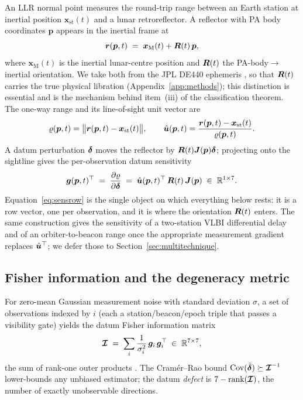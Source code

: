 An LLR normal point measures the round-trip range between an Earth station at
inertial position $\bm{x}_{\mathrm{st}}(t)$ and a lunar retroreflector. A reflector
with PA body coordinates $\bm{p}$ appears in the inertial frame at
\begin{equation}
  \bm{r}(\bm{p},t) \;=\; \bm{x}_{\mathrm{M}}(t) + \bm{R}(t)\,\bm{p},
  \label{eq:beacon}
\end{equation}
where $\bm{x}_{\mathrm{M}}(t)$ is the inertial lunar-centre position and
$\bm{R}(t)$ the PA-body$\rightarrow$inertial orientation. We take both from the
JPL DE440 ephemeris \citep{park2021de440}, so that $\bm{R}(t)$ carries the true
physical libration (Appendix~\ref{app:methods}); this distinction is essential and
is the mechanism behind item~(iii) of the classification theorem. The one-way
range and its line-of-sight unit vector are
\begin{equation}
  \varrho(\bm{p},t) = \bigl\|\bm{r}(\bm{p},t)-\bm{x}_{\mathrm{st}}(t)\bigr\|,
  \qquad
  \hat{\bm{u}}(\bm{p},t) = \frac{\bm{r}(\bm{p},t)-\bm{x}_{\mathrm{st}}(t)}
                         {\varrho(\bm{p},t)}.
  \label{eq:range}
\end{equation}
A datum perturbation $\bm{\delta}$ moves the reflector by $\bm{R}(t)\bm{J}(\bm{p})\bm{\delta}$;
projecting onto the sightline gives the per-observation datum sensitivity
\begin{equation}
  \bm{g}(\bm{p},t)^\top
  \;=\; \frac{\partial \varrho}{\partial \bm{\delta}}
  \;=\; \hat{\bm{u}}(\bm{p},t)^\top\,\bm{R}(t)\,\bm{J}(\bm{p}) \;\in\;\mathbb{R}^{1\times7}.
  \label{eq:sensrow}
\end{equation}
Equation~\eqref{eq:sensrow} is the single object on which everything below rests:
it is a row vector, one per observation, and it is where the orientation $\bm{R}(t)$
enters. The same construction gives the sensitivity of a two-station VLBI
differential delay and of an orbiter-to-beacon range once the appropriate
measurement gradient replaces $\hat{\bm{u}}^\top$; we defer those to
Section~\ref{sec:multitechnique}.

\subsection{Fisher information and the degeneracy metric}
\label{sec:fisher}

For zero-mean Gaussian measurement noise with standard deviation $\sigma$, a set of
observations indexed by $i$ (each a station/beacon/epoch triple that passes a
visibility gate) yields the datum Fisher information matrix
\begin{equation}
  \bm{\mathcal{I}} \;=\; \sum_i \frac{1}{\sigma_i^2}\,
  \bm{g}_i\,\bm{g}_i^\top \;\in\;\mathbb{R}^{7\times7},
  \label{eq:fisher}
\end{equation}
the sum of rank-one outer products \citep{kay1993estimation}. The Cram\'er--Rao
bound $\mathrm{Cov}(\hat{\bm{\delta}}) \succeq \bm{\mathcal{I}}^{-1}$ lower-bounds any unbiased
estimator; the datum \emph{defect} is $7-\operatorname{rank}(\bm{\mathcal{I}})$, the number
of exactly unobservable directions.

